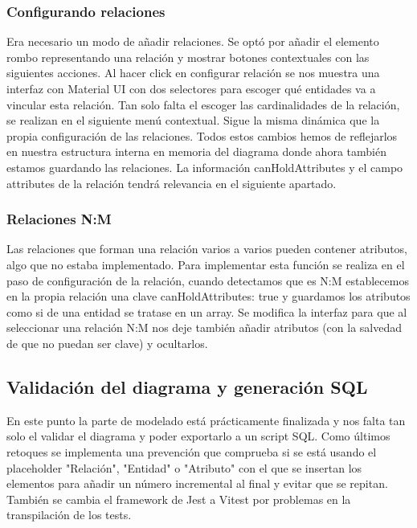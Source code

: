 \subsubsection{Configurando relaciones}
Era necesario un modo de añadir relaciones. Se optó por añadir el elemento rombo representando una relación y mostrar botones contextuales con las siguientes acciones.
Al hacer click en configurar relación se nos muestra una interfaz con Material UI con dos selectores para escoger qué entidades va a vincular esta relación.
Tan solo falta el escoger las cardinalidades de la relación, se realizan en el siguiente menú contextual. Sigue la misma dinámica que la propia configuración de las relaciones.
Todos estos cambios hemos de reflejarlos en nuestra estructura interna en memoria del diagrama donde ahora también estamos guardando las relaciones.
La información canHoldAttributes y el campo attributes de la relación tendrá relevancia en el siguiente apartado.
\subsubsection{Relaciones N:M}
Las relaciones que forman una relación varios a varios pueden contener atributos, algo que no estaba implementado. Para implementar esta función se realiza en el paso de configuración de la relación, cuando detectamos que es N:M establecemos en la propia relación una clave canHoldAttributes: true y guardamos los atributos como si de una entidad se tratase en un array.
Se modifica la interfaz para que al seleccionar una relación N:M nos deje también añadir atributos (con la salvedad de que no puedan ser clave) y ocultarlos.

\subsection{Validación del diagrama y generación SQL}
En este punto la parte de modelado está prácticamente finalizada y nos falta tan solo el validar el diagrama y poder exportarlo a un script SQL.
Como últimos retoques se implementa una prevención que comprueba si se está usando el placeholder "Relación", "Entidad" o "Atributo" con el que se insertan los elementos para añadir un número incremental al final y evitar que se repitan.
También se cambia el framework de Jest a Vitest por problemas en la transpilación de los tests.
